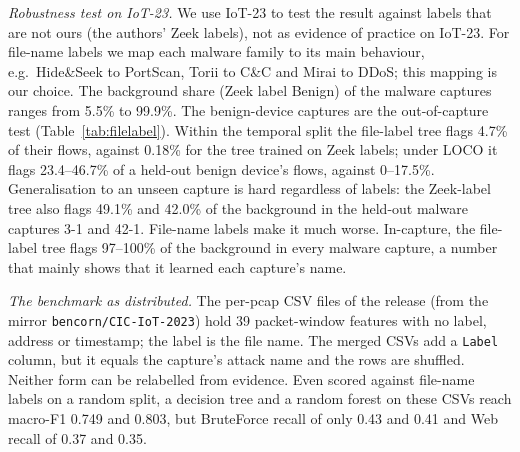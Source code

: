 \emph{Robustness test on IoT-23.} We use IoT-23 to test the result against labels that are not ours (the authors' Zeek labels), not as evidence of practice on IoT-23. For file-name labels we map each malware family to its main behaviour, e.g.\ Hide\&Seek to PortScan, Torii to C\&C and Mirai to DDoS; this mapping is our choice. The background share (Zeek label Benign) of the malware captures ranges from 5.5\% to 99.9\%. The benign-device captures are the out-of-capture test (Table~\ref{tab:filelabel}). Within the temporal split the file-label tree flags 4.7\% of their flows, against 0.18\% for the tree trained on Zeek labels; under LOCO it flags 23.4--46.7\% of a held-out benign device's flows, against 0--17.5\%. Generalisation to an unseen capture is hard regardless of labels: the Zeek-label tree also flags 49.1\% and 42.0\% of the background in the held-out malware captures 3-1 and 42-1. File-name labels make it much worse. In-capture, the file-label tree flags 97--100\% of the background in every malware capture, a number that mainly shows that it learned each capture's name.

\emph{The benchmark as distributed.} The per-pcap CSV files of the release (from the mirror \texttt{bencorn/CIC-IoT-2023}) hold 39 packet-window features with no label, address or timestamp; the label is the file name. The merged CSVs add a \texttt{Label} column, but it equals the capture's attack name and the rows are shuffled. Neither form can be relabelled from evidence. Even scored against file-name labels on a random split, a decision tree and a random forest on these CSVs reach macro-F1 0.749 and 0.803, but BruteForce recall of only 0.43 and 0.41 and Web recall of 0.37 and 0.35.
